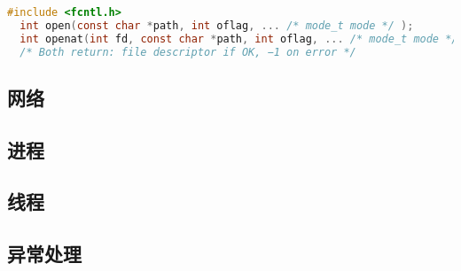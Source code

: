 
\begin{lstlisting}[language=C]
  #include <fcntl.h>
  int open(const char *path, int oflag, ... /* mode_t mode */ );
  int openat(int fd, const char *path, int oflag, ... /* mode_t mode */ );
  /* Both return: file descriptor if OK, −1 on error */
\end{lstlisting}

\subsection{网络}

\subsection{进程}

\subsection{线程}

\subsection{异常处理}

